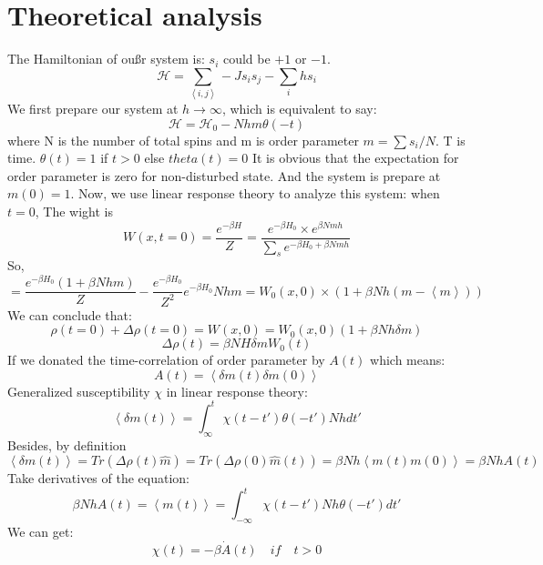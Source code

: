 \documentclass[a4paper]{article}
\begin{document}
\section{Theoretical analysis}
The Hamiltonian of oußr system is: $s_i$ could be $+1$ or $-1$.
$$\mathcal{H}=\sum_{\left\langle i,j\right\rangle}-Js_is_j-\sum_ihs_i$$
We first prepare our system at $h\rightarrow\infty$, which is equivalent to say:
$$\mathcal{H} = \mathcal{H}_0-Nhm\theta(-t)$$
where N is the number of total spins and m is order parameter $m=\sum s_i/N$. T is time. $\theta(t)=1$ if $t>0$ else $theta(t)=0$
It is obvious that the expectation for order parameter is zero for non-disturbed state.
And the system is prepare at $m(0)=1$.\newline
Now, we use linear response theory to analyze this system: when $t=0$, The wight is 
$$W(x,t=0) = \frac{e^{-\beta H}}{Z}=\frac{e^{-\beta H_0}\times e^{\beta Nmh}}{\sum_{s}e^{-\beta H_0+\beta Nmh}}$$
So,
$$=\frac{e^{-\beta H_0}(1+\beta Nhm)}{Z}-\frac{e^{-\beta H_0}}{Z^2}e^{-\beta H_0}Nhm=W_0(x,0)\times(1+\beta Nh(m-\left\langle m\right\rangle))$$
We can conclude that:
$$\rho(t=0)+\Delta\rho(t=0)=W(x,0)=W_0(x,0)(1+\beta Nh\delta m) $$
$$\Delta\rho(t) = \beta NH\delta mW_0(t)$$
If we donated the time-correlation of order parameter by $A(t)$ which means:
$$A(t)=\left\langle\delta m(t)\delta m(0)\right\rangle$$
Generalized susceptibility $\chi$ in linear response theory:
$$\left\langle \delta m(t)\right\rangle=\int_{\infty}^{t}\chi(t-t')\theta(-t')Nhdt'$$
Besides, by definition
$$\left\langle \delta m(t)\right\rangle=Tr(\Delta\rho(t)\hat{m})=Tr(\Delta\rho(0)\hat{m}(t))=\beta Nh \left\langle m(t)m(0)\right\rangle=\beta NhA(t)$$
Take derivatives of the equation:
$$\beta NhA(t)=\left\langle m(t)\right\rangle=\int_{-\infty}^{t}\chi(t-t')Nh\theta(-t')dt'$$
We can get:
$$\chi(t)= -\beta\dot{A}(t)\quad if\quad t>0$$

% 
\end{document}
